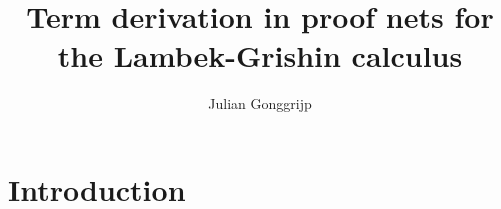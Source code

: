 \documentclass{article}
\title{Term derivation in proof nets for the Lambek-Grishin calculus}
\author{Julian Gonggrijp}
\date{}
\begin{document}
\maketitle

\section{Introduction}



\inputminted{haskell}{../src/LG/Term.hs}

\inputminted{haskell}{../src/LG/Subnet.hs}

\inputminted{haskell}{../src/LG/SubnetGraph.hs}

\inputminted{haskell}{../src/LG/TestGraph.hs}
\end{document}
